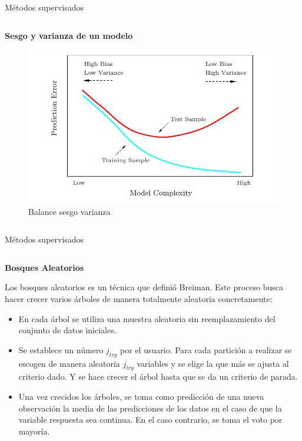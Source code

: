 \begin{frame}{Métodos supervisados}
\begin{columns}
\begin{column}{0.9\textwidth}
\textbf{Sesgo y varianza de un modelo}
\begin{center}

\begin{figure}[h]
\includegraphics[scale=0.45]{Documentos Extra/Imagenes/Bias-Variance-Tradeoff.png}
\caption{Balance sesgo varianza}
\label{fig:Balance-sesgo-varianza}
\end{figure}
\end{center}
\end{column}
\end{columns}
\end{frame}

\begin{frame}{Métodos supervisados}
\begin{columns}
\begin{column}{0.9\textwidth}
\textbf{Bosques Aleatorios}

Los bosques aleatorios es un  técnica que definió Breiman. Este proceso busca hacer crecer varios árboles de manera totalmente aleatoria concretamente: 
\begin{itemize}
\item En cada árbol se utiliza una muestra aleatoria sin reemplazamiento del conjunto de datos iniciales. 
\item Se establece un número $j_{try}$ por el usuario. Para cada partición a realizar se escogen de manera aleatoria $j_{try}$ variables y se elige la que más se ajusta al criterio dado. Y se hace crecer el árbol hasta que se da un criterio de parada. 
 
\item Una vez crecidos los árboles, se toma como predicción de una nueva observación la media de las predicciones de los datos en el caso de que la variable respuesta sea continua. En el caso contrario, se toma el voto por mayoría. 
\end{itemize} 
\end{column}
\end{columns}
\end{frame}

